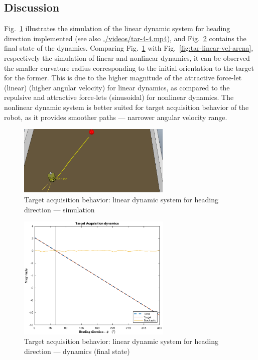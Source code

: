 \subsection{Discussion}%
\label{sec:discussion-linear-phi}
Fig.~\ref{fig:tar-4-4-arena} illustrates the simulation of the linear dynamic
system for heading direction implemented (see also \href{run:./videos/tar-4-4.mp4}{./videos/tar-4-4.mp4}), and Fig.~\ref{fig:tar-4-4} contains
the final state of the dynamics. Comparing Fig.~\ref{fig:tar-4-4-arena} with
Fig.~\ref{fig:tar-linear-vel-arena}, respectively the simulation of linear and
nonlinear dynamics, it can be observed the smaller curvature radius
corresponding to the initial orientation to the target for the former. This is
due to the higher magnitude of the attractive force-let (linear) (higher angular
velocity) for linear dynamics, as compared to
the repulsive and attractive force-lets (sinusoidal) for nonlinear
dynamics. The nonlinear dynamic system is better suited for target acquisition
behavior of the robot, as it provides smoother paths --- narrower angular
velocity range.
%
\begin{figure}[!hbt]
\centering
    \includegraphics[width=0.65\textwidth]{./img/tar-4-4-arena.png}
  \caption{Target acquisition behavior: linear dynamic system for heading
    direction --- simulation}%
\label{fig:tar-4-4-arena}
\end{figure}
%
\begin{figure}[!hbt]
\centering
    \includegraphics[width=0.65\textwidth]{./img/tar-4-4.eps}
  \caption{Target acquisition behavior: linear dynamic system for heading
    direction --- dynamics (final state)}%
\label{fig:tar-4-4}
\end{figure}
%
%
%
